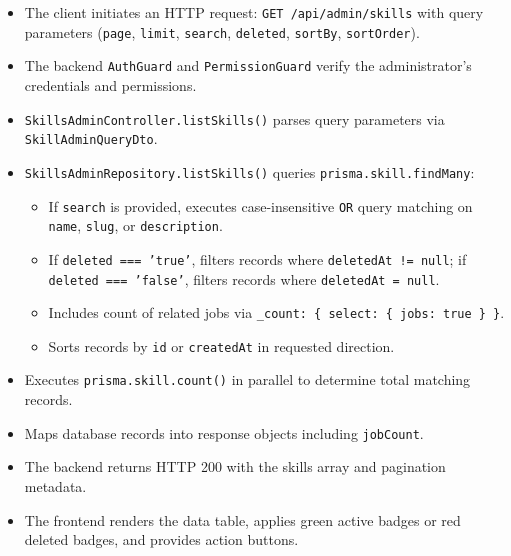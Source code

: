 \begin{itemize}[leftmargin=1.6em,topsep=3pt,itemsep=2pt,parsep=0pt,label=$\bullet$]
    \item The client initiates an HTTP request: \texttt{GET /api/admin/skills} with query parameters (\texttt{page}, \texttt{limit}, \texttt{search}, \texttt{deleted}, \texttt{sortBy}, \texttt{sortOrder}).
    \item The backend \texttt{AuthGuard} and \texttt{Permission\allowbreak{}Guard} verify the administrator's credentials and permissions.
    \item \texttt{Skills\allowbreak{}Admin\allowbreak{}Controller.\allowbreak{}listSkills()} parses query parameters via \texttt{Skill\allowbreak{}Admin\allowbreak{}Query\allowbreak{}Dto}.
    \item \texttt{Skills\allowbreak{}Admin\allowbreak{}Repository.\allowbreak{}listSkills()} queries \texttt{prisma.\allowbreak{}skill.\allowbreak{}findMany}:
        \begin{itemize}[leftmargin=1.6em,topsep=2pt,itemsep=2pt,parsep=0pt]
            \item If \texttt{search} is provided, executes case-insensitive \texttt{OR} query matching on \texttt{name}, \texttt{slug}, or \texttt{description}.
            \item If \texttt{deleted === 'true'}, filters records where \texttt{deletedAt != null}; if \texttt{deleted === 'false'}, filters records where \texttt{deletedAt = null}.
            \item Includes count of related jobs via \texttt{\_count: \{ select: \{ jobs: true \} \}}.
            \item Sorts records by \texttt{id} or \texttt{createdAt} in requested direction.
        \end{itemize}
    \item Executes \texttt{prisma.skill.count()} in parallel to determine total matching records.
    \item Maps database records into response objects including \texttt{jobCount}.
    \item The backend returns HTTP 200 with the skills array and pagination metadata.
    \item The frontend renders the data table, applies green active badges or red deleted badges, and provides action buttons.
\end{itemize}

